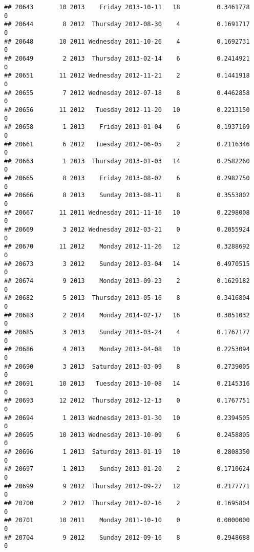 \documentclass[
]{article}
\begin{document}
\begin{verbatim}
## 20643       10 2013    Friday 2013-10-11   18          0.3461778             0
## 20644        8 2012  Thursday 2012-08-30    4          0.1691717             0
## 20648       10 2011 Wednesday 2011-10-26    4          0.1692731             0
## 20649        2 2013  Thursday 2013-02-14    6          0.2414921             0
## 20651       11 2012 Wednesday 2012-11-21    2          0.1441918             0
## 20655        7 2012 Wednesday 2012-07-18    8          0.4462858             0
## 20656       11 2012   Tuesday 2012-11-20   10          0.2213150             0
## 20658        1 2013    Friday 2013-01-04    6          0.1937169             0
## 20661        6 2012   Tuesday 2012-06-05    2          0.2116346             0
## 20663        1 2013  Thursday 2013-01-03   14          0.2582260             0
## 20665        8 2013    Friday 2013-08-02    6          0.2982750             0
## 20666        8 2013    Sunday 2013-08-11    8          0.3553802             0
## 20667       11 2011 Wednesday 2011-11-16   10          0.2298008             0
## 20669        3 2012 Wednesday 2012-03-21    0          0.2055924             0
## 20670       11 2012    Monday 2012-11-26   12          0.3288692             0
## 20673        3 2012    Sunday 2012-03-04   14          0.4970515             0
## 20674        9 2013    Monday 2013-09-23    2          0.1629182             0
## 20682        5 2013  Thursday 2013-05-16    8          0.3416804             0
## 20683        2 2014    Monday 2014-02-17   16          0.3051032             0
## 20685        3 2013    Sunday 2013-03-24    4          0.1767177             0
## 20686        4 2013    Monday 2013-04-08   10          0.2253094             0
## 20690        3 2013  Saturday 2013-03-09    8          0.2739005             0
## 20691       10 2013   Tuesday 2013-10-08   14          0.2145316             0
## 20693       12 2012  Thursday 2012-12-13    0          0.1767751             0
## 20694        1 2013 Wednesday 2013-01-30   10          0.2394505             0
## 20695       10 2013 Wednesday 2013-10-09    6          0.2458805             0
## 20696        1 2013  Saturday 2013-01-19   10          0.2808350             0
## 20697        1 2013    Sunday 2013-01-20    2          0.1710624             0
## 20699        9 2012  Thursday 2012-09-27   12          0.2177771             0
## 20700        2 2012  Thursday 2012-02-16    2          0.1695804             0
## 20701       10 2011    Monday 2011-10-10    0          0.0000000             0
## 20704        9 2012    Sunday 2012-09-16    8          0.2948688             0

\end{verbatim}
\end{document}
